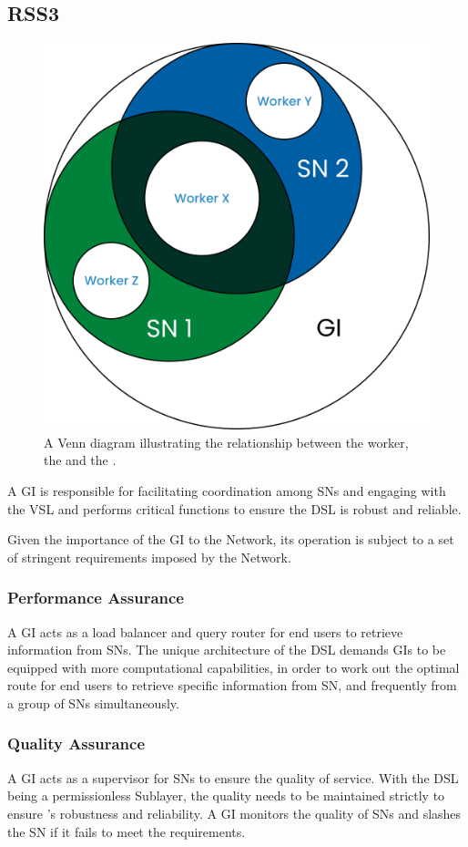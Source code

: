 \subsection{RSS3 }
\label{subsec:GI}

{
    \begin{figure}[tb!]
        \centering
        \includegraphics[width=0.7\columnwidth]{figures/GI.png}
        \caption{A Venn diagram illustrating the relationship between the worker, the  and the .}
        \label{fig:GI}
    \end{figure}
}

A \gls{GI} is responsible for facilitating coordination among \glspl{SN} and engaging with the \gls{VSL} and performs critical functions to ensure the \gls{DSL} is robust and reliable.

Given the importance of the \gls{GI} to the Network, its operation is subject to a set of stringent requirements imposed by the Network.

\subsubsection{Performance Assurance} A GI acts as a load balancer and query router for end users to retrieve information from \glspl{SN}.
The unique architecture of the \gls{DSL} demands \glspl{GI} to be equipped with more computational capabilities, in order to work out the optimal route for end users to retrieve specific information from \gls{SN}, and frequently from a group of \glspl{SN} simultaneously.

\subsubsection{Quality Assurance} A GI acts as a supervisor for \glspl{SN} to ensure the quality of service.
With the \gls{DSL} being a permissionless Sublayer, the quality needs to be maintained strictly to ensure 's robustness and reliability.
A \gls{GI} monitors the quality of \glspl{SN} and slashes the \gls{SN} if it fails to meet the requirements.

